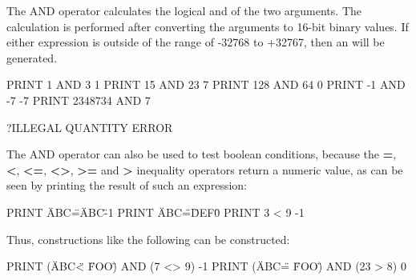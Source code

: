The AND operator calculates the logical and of the two arguments.
The calculation is performed after converting the arguments to 16-bit binary values.
If either expression is outside of the range of -32768 to +32767, then an  will be generated.

\begin{screenoutput}
  PRINT 1 AND 3
  1
  PRINT 15 AND 23
  7
  PRINT 128 AND 64
  0
  PRINT -1 AND -7
  -7
  PRINT 2348734 AND 7

  ?ILLEGAL QUANTITY ERROR
\end{screenoutput}

The AND operator can also be used to test boolean conditions, because the {\bf =}, {\bf <}, {\bf <=}, {\bf <>}, {\bf >=} and {\bf >} inequality operators return a numeric value, as can be seen by printing the result of such an expression:

\begin{screenoutput}
  PRINT \"ABC\"=\"ABC\"
  -1
  PRINT \"ABC\"=\"DEF\"
  0
  PRINT 3 < 9
  -1
\end{screenoutput}

Thus, constructions like the following can be constructed:

\begin{screenoutput}
  PRINT (\"ABC\" < \"FOO\") AND (7 <> 9)
  -1
  PRINT (\"ABC\" = \"FOO\") AND (23 > 8)
  0
\end{screenoutput}
